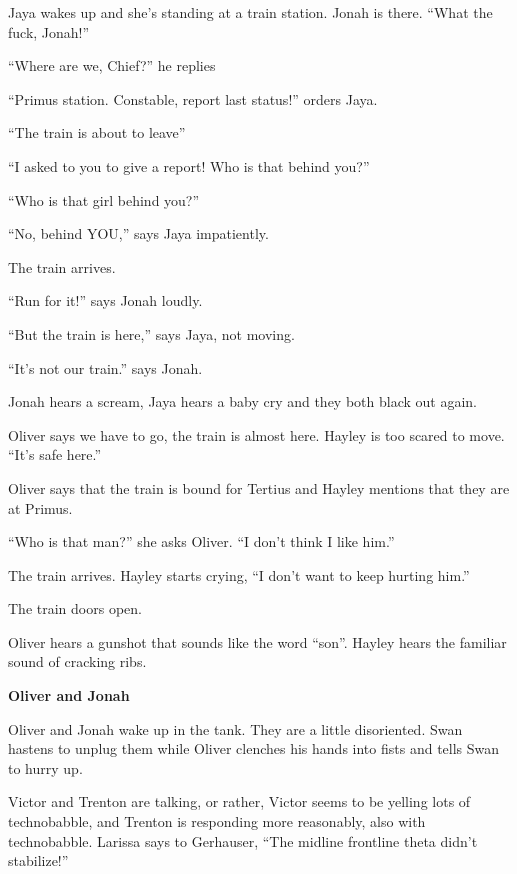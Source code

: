 Jaya wakes up and she's standing at a train station.  Jonah is there.  ``What the fuck, Jonah!''

``Where are we, Chief?'' he replies

``Primus station.  Constable, report last status!'' orders Jaya.

``The train is about to leave''

``I asked to you to give a report!   Who is that behind you?''

``Who is that girl behind you?''

``No, behind YOU,'' says Jaya impatiently.

The train arrives.

``Run for it!'' says Jonah loudly.

``But the train is here,'' says Jaya, not moving.

``It's not our train.'' says Jonah.

Jonah hears a scream, Jaya hears a baby cry and they both black out again.



Oliver says we have to go, the train is almost here.   Hayley is too scared to move.  ``It's safe here.''

Oliver says that the train is bound for Tertius and Hayley mentions that they are at Primus.

``Who is that man?'' she asks Oliver.  ``I don't think I like him.''  

The train arrives.  Hayley starts crying, ``I don't want to keep hurting him.''

The train doors open.

Oliver hears a gunshot that sounds like the word ``son''.  Hayley hears the familiar sound of cracking ribs.



\textbf{Oliver and Jonah}



Oliver and Jonah wake up in the tank.  They are a little disoriented.  Swan hastens to unplug them while Oliver clenches his hands into fists and tells Swan to hurry up.



Victor and Trenton are talking, or rather, Victor seems to be yelling lots of technobabble, and Trenton is responding more reasonably, also with technobabble.  Larissa says to Gerhauser, ``The midline frontline theta didn't stabilize!''

